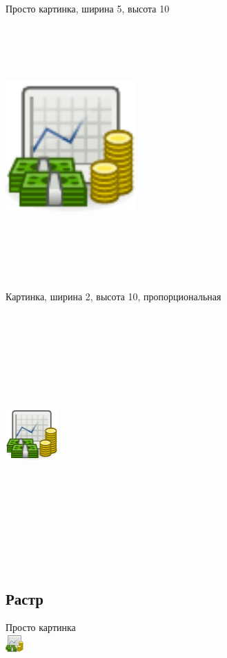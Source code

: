 \documentclass[a4paper,12pt]{article}                       %
\begin{document}
Просто картинка, ширина 5, высота 10\\
\includegraphics[width=5cm,height=10cm]{7-image.pdf}

Картинка, ширина 2, высота 10, пропорциональная\\
\includegraphics[width=2cm,height=10cm,keepaspectratio]{7-image.pdf}

\subsection{Растр}

Просто картинка\\
\includegraphics{7-image.png}
\end{document}
